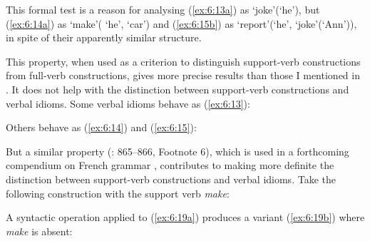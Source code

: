 \documentclass[output=paper]{langsci/langscibook}
\begin{document}
\begin{exe}
\ex \label{ex:6:15}
\begin{xlist}
\end{xlist}
\end{exe}

\noindent This formal test is a reason for analysing (\ref{ex:6:13a}) as ‘joke’(‘he’), but (\ref{ex:6:14a}) as ‘make’( ‘he’, ‘car’) and (\ref{ex:6:15b}) as ‘report’(‘he’, ‘joke’(‘Ann’)), in spite of their apparently similar structure.

This property, when used as a criterion to distinguish support-verb constructions from full-verb constructions, gives more precise results than those I mentioned in . It does not help with the distinction between support-verb constructions and verbal idioms. Some verbal idioms behave as (\ref{ex:6:13}):

\begin{exe}
\ex \label{ex:6:16}
\begin{xlist}
\end{xlist}
\end{exe}

\noindent Others behave as (\ref{ex:6:14}) and (\ref{ex:6:15}): 

\begin{exe}
\ex \label{ex:6:17}
\begin{xlist}
\end{xlist}
\end{exe}
	 

\noindent But a similar property (\citealt{Gross1979}: 865–866, Footnote 6), which is used in a forthcoming compendium on French grammar \citep[16]{Abeille2011}, contributes to making more definite the distinction between support-verb constructions and verbal idioms. Take the following construction with the support verb \textit{make}: 

\begin{exe}
\end{exe}
	 

\noindent A syntactic operation applied to (\ref{ex:6:19a}) produces a variant (\ref{ex:6:19b}) where \textit{make} is absent:
\end{document}
